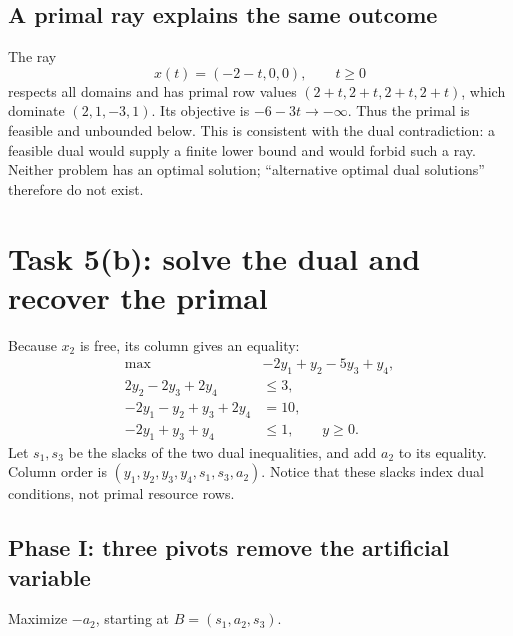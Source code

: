 \documentclass[11pt,a4paper]{article}
\begin{document}
\subsection{A primal ray explains the same outcome}
The ray
\[
  x(t)=(-2-t,0,0),\qquad t\geq0
\]
respects all domains and has primal row values $(2+t,2+t,2+t,2+t)$,
which dominate $(2,1,-3,1)$. Its objective is $-6-3t\to-\infty$.
Thus the primal is feasible and unbounded below. This is consistent with the
dual contradiction: a feasible dual would supply a finite lower bound and
would forbid such a ray. Neither problem has an optimal solution;
``alternative optimal dual solutions'' therefore do not exist.

\section{Task 5(b): solve the dual and recover the primal}\label{sec:task5b}
Because $x_2$ is free, its column gives an equality:
\[
  \begin{aligned}
    \max\quad &-2y_1+y_2-5y_3+y_4,\\
    2y_2-2y_3+2y_4&\leq3,\\
    -2y_1-y_2+y_3+2y_4&=10,\\
    -2y_1+y_3+y_4&\leq1,\qquad y\geq0.
  \end{aligned}
\]
Let $s_1,s_3$ be the slacks of the two dual inequalities, and add $a_2$ to
its equality. Column order is $(y_1,y_2,y_3,y_4,s_1,s_3,a_2)$.
Notice that these slacks index dual conditions, not primal resource rows.

\subsection{Phase I: three pivots remove the artificial variable}
Maximize $-a_2$, starting at $B=(s_1,a_2,s_3)$.
\end{document}
